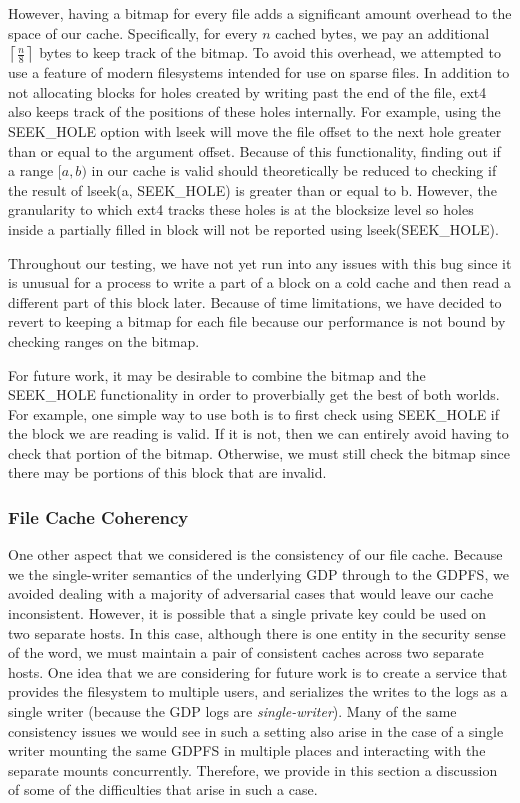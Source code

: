 \documentclass{acm_proc_article-sp}
\begin{document}
However, having a bitmap for every file adds a significant amount overhead to the space of our cache. Specifically, for every $n$ cached bytes, we pay an additional $\left\lceil\frac{n}{8}\right\rceil$ bytes to keep track of the bitmap. To avoid this overhead, we attempted to use a feature of modern filesystems intended for use on sparse files. In addition to not allocating blocks for holes created by writing past the end of the file, ext4 also keeps track of the positions of these holes internally. For example, using the SEEK\_HOLE option with lseek will move the file offset to the next hole greater than or equal to the argument offset. Because of this functionality, finding out if a range $[a,b)$ in our cache is valid should theoretically be reduced to checking if the result of lseek(a, SEEK\_HOLE) is greater than or equal to b. However, the granularity to which ext4 tracks these holes is at the blocksize level so holes inside a partially filled in block will not be reported using lseek(SEEK\_HOLE). 

Throughout our testing, we have not yet run into any issues with this bug since it is unusual for a process to write a part of a block on a cold cache and then read a different part of this block later. Because of time limitations, we have decided to revert to keeping a bitmap for each file because our performance is not bound by checking ranges on the bitmap. 

For future work, it may be desirable to combine the bitmap and the SEEK\_HOLE functionality in order to proverbially get the best of both worlds. For example, one simple way to use both is to first check using SEEK\_HOLE if the block we are reading is valid. If it is not, then we can entirely avoid having to check that portion of the bitmap. Otherwise, we must still check the bitmap since there may be portions of this block that are invalid.

\subsubsection{File Cache Coherency}
One other aspect that we considered is the consistency of our file cache. Because we the single-writer semantics of the underlying GDP through to the GDPFS, we avoided dealing with a majority of adversarial cases that would leave our cache inconsistent. However, it is possible that a single private key could be used on two separate hosts. In this case, although there is one entity in the security sense of the word, we must maintain a pair of consistent caches across two separate hosts. One idea that we are considering for future work is to create a service that provides the filesystem to multiple users, and serializes the writes to the logs as a single writer (because the GDP logs are \emph{single-writer}). Many of the same consistency issues we would see in such a setting also arise in the case of a single writer mounting the same GDPFS in multiple places and interacting with the separate mounts concurrently. Therefore, we provide in this section a discussion of some of the difficulties that arise in such a case.
\end{document}
